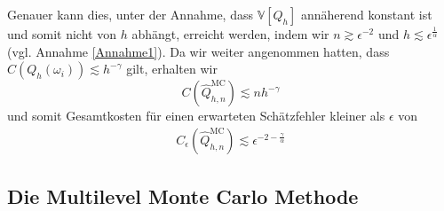  Genauer kann dies, unter der Annahme, dass $ \mathbb{V}[Q_h] $ annäherend konstant ist und somit nicht von $ h $ abhängt, erreicht werden, indem wir $ n \gtrsim \epsilon^{-2} $ und $ h \lesssim \epsilon^{\frac{1}{\alpha}}  $ (vgl. Annahme \ref{Annahme1}).
 Da wir weiter angenommen hatten, dass $ C(Q_h(\omega_i))  \lesssim h^{- \gamma} $ gilt, erhalten wir 
 \[ 
 	C(\widehat{Q}_{h,n}^{\text{MC}}) \lesssim n h^{-\gamma}
 \]
 und somit Gesamtkosten für einen erwarteten Schätzfehler kleiner als $ \epsilon $ von
 \begin{align}
	 C_{\epsilon}(\widehat{Q}_{h,n}^{\text{MC}}) \lesssim \epsilon^{-2-\frac{\gamma}{\alpha}}
 \end{align}
 
\subsection{Die Multilevel Monte Carlo Methode}

